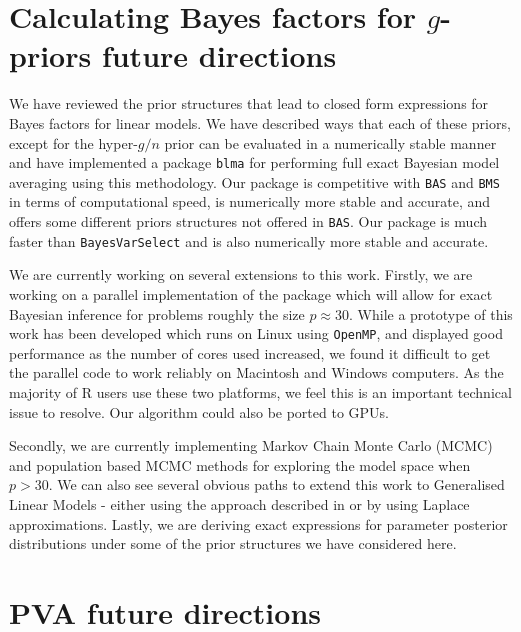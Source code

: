 \section{Calculating Bayes factors for $g$-priors future directions}

We have reviewed the prior structures that lead to closed form expressions for
Bayes factors for linear models. We have described ways that each of these
priors, except for the hyper-$g/n$ prior can be evaluated in a numerically stable
manner and have implemented a package \texttt{blma} for performing full exact
Bayesian model averaging using this methodology. Our package is competitive
with \texttt{BAS} and \texttt{BMS} in terms of computational speed, is
numerically more stable and accurate, and offers some different priors
structures not offered in \texttt{BAS}. Our package is much faster than
\texttt{BayesVarSelect} and is also numerically more stable and accurate.

We are currently working on several extensions to this work. Firstly, we are
working on a parallel implementation of the package which will allow for exact
Bayesian inference for problems roughly the size $p\approx 30$. While a
prototype of this work has been developed which runs on Linux using
\texttt{OpenMP}, and displayed good performance as the number of cores used
increased, we found it difficult to get the parallel code to work reliably on
Macintosh and Windows computers.  As the majority of R users use these two
platforms, we feel this is an important technical issue to resolve. Our
algorithm could also be ported to GPUs.

Secondly, we are currently implementing  Markov Chain Monte Carlo (MCMC) and
population based MCMC methods for exploring the model space when $p>30$.  We
can also see several obvious paths to extend this work to Generalised Linear
Models - either using the approach described in \cite{Li2015} or by using
Laplace approximations.  Lastly, we are deriving exact expressions for
parameter posterior distributions under some of the prior structures we have
considered here.


\section{PVA future directions}


